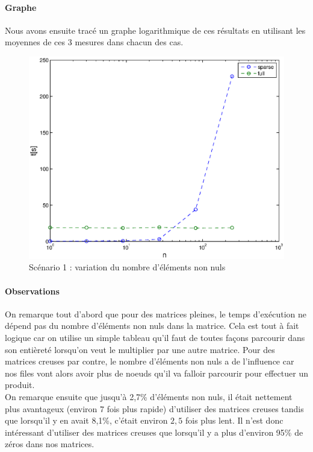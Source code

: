 \documentclass[12pt,a4paper]{article}
\begin{document}
\paragraph{Graphe}
Nous avons ensuite tracé un graphe logarithmique de ces résultats en utilisant les moyennes de ces 3 mesures dans chacun des cas.
\begin{figure}[!h]
	\begin{center}
		\includegraphics[width=15cm]{taillecst.eps}
		\caption{Scénario 1 : variation du nombre d'éléments non nuls}
		\label{vnz}
	\end{center}
\end{figure}

\paragraph{Observations}

On remarque tout d'abord que pour des matrices pleines, le temps d'exécution ne dépend pas du nombre d'éléments non nuls dans la matrice. Cela est tout à fait logique car on utilise un simple tableau qu'il faut de toutes façons parcourir dans son entièreté lorsqu'on veut le multiplier par une autre matrice. Pour des matrices creuses par contre, le nombre d'éléments non nuls a de l'influence car nos files vont alors avoir plus de noeuds qu'il va falloir parcourir pour effectuer un produit.\\

On remarque ensuite que jusqu'à 2,7\% d'éléments non nuls, il était nettement plus avantageux (environ $7$ fois plus rapide) d'utiliser des matrices creuses tandis que lorsqu'il y en avait 8,1\%, c'était environ $2,5$ fois plus lent. Il n'est donc intéressant d'utiliser des matrices creuses que lorsqu'il y a plus d'environ 95\% de zéros dans nos matrices.
\end{document}
